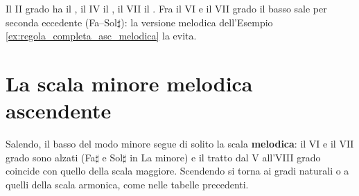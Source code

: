 \begin{esempio}
	\label{ex:regola_completa_asc_min}
	Il II grado ha il , il IV il , il VII il . Fra il VI e il VII grado il basso sale per seconda eccedente (Fa--Sol$\sharp$): la versione melodica dell'Esempio \ref{ex:regola_completa_asc_melodica} la evita.
\end{esempio}

\begin{esempio}
	\label{ex:regola_completa_disc_min}
\end{esempio}

\section{La scala minore melodica ascendente}
\label{sec:regola_completa_melodica}

Salendo, il basso del modo minore segue di solito la scala \textbf{melodica}: il VI e il VII grado sono alzati (Fa$\sharp$ e Sol$\sharp$ in La minore) e il tratto dal V all'VIII grado coincide con quello della scala maggiore. Scendendo si torna ai gradi naturali o a quelli della scala armonica, come nelle tabelle precedenti.

